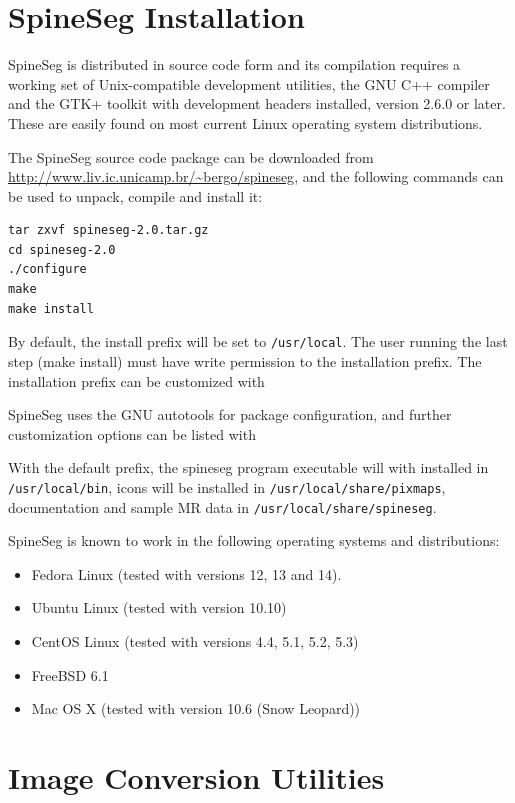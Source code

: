 \documentclass[12pt]{report}
\begin{document}
\section{SpineSeg Installation}

SpineSeg is distributed in source code form and its compilation
requires a working set of Unix-compatible development utilities, the
GNU C++ compiler and the GTK+ toolkit with development headers
installed, version 2.6.0 or later. These are easily found on most
current Linux operating system distributions.

The SpineSeg source code package can be downloaded from
\url{http://www.liv.ic.unicamp.br/~bergo/spineseg}, and the following
commands can be used to unpack, compile and install it:

\begin{verbatim}
tar zxvf spineseg-2.0.tar.gz
cd spineseg-2.0
./configure
make
make install
\end{verbatim}

By default, the install prefix will be set to \texttt{/usr/local}. The
user running the last step (make install) must have write permission
to the installation prefix. The installation prefix can be customized
with


SpineSeg uses the GNU autotools for package configuration, and further
customization options can be listed with


With the default prefix, the spineseg program executable will with
installed in \texttt{/usr/local/bin}, icons will be installed in
\texttt{/usr/local/share/pixmaps}, documentation and sample MR data in
\texttt{/usr/local/share/spineseg}.

SpineSeg is known to work in the following operating systems and distributions:

\begin{itemize}
\item Fedora Linux (tested with versions 12, 13 and 14).
\item Ubuntu Linux (tested with version 10.10)
\item CentOS Linux (tested with versions 4.4, 5.1, 5.2, 5.3)
\item FreeBSD 6.1
\item Mac OS X (tested with version 10.6 (Snow Leopard))
\end{itemize}

\section{Image Conversion Utilities}
\end{document}
